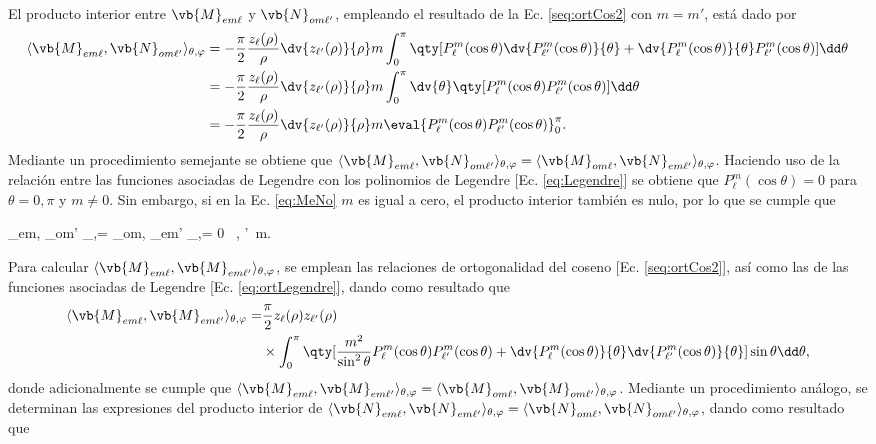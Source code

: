  El producto interior entre $\vb{M}_{em\ell}$ y $\vb{N}_{om\ell'}$, empleando el resultado de la Ec. \eqref{seq:ortCos2} con $m=m'$, está dado por
	\begin{align}
		\langle\vb{M}_{em\ell},  \vb{N}_{om\ell'} \rangle_{\theta,\varphi} &= - \frac{\pi}{2} \frac{z_\ell (\rho)}{\rho}\dv{z_{\ell'}(\rho)}{\rho}	m
							 \int_0^\pi\qty[P_\ell^m(\cos \theta )\dv{P_{\ell'}^m(\cos \theta )}{\theta}+ 
							  \dv{P_{\ell}^m(\cos \theta )}{\theta}P_{\ell'}^m(\cos \theta )] \dd\theta \notag\\
					 &=- \frac{\pi}{2} \frac{z_\ell (\rho)}{\rho}\dv{z_{\ell'}(\rho)}{\rho}	m 
					 	\int_0^\pi \dv{\theta}\qty[P_\ell^m(\cos\theta)P_{\ell'}^m(\cos\theta)]\dd\theta \notag\\
					 &=- \frac{\pi}{2} \frac{z_\ell (\rho)}{\rho}\dv{z_{\ell'}(\rho)}{\rho}	m \eval{P_\ell^m(\cos\theta)P_{\ell'}^m(\cos\theta)}_0^\pi.
					 	\label{eq:MeNo}
	\end{align}
Mediante un procedimiento semejante se obtiene que $\langle\vb{M}_{em\ell},  \vb{N}_{om\ell'} \rangle_{\theta,\varphi}=\langle\vb{M}_{om\ell},  \vb{N}_{em\ell'} \rangle_{\theta,\varphi}$. Haciendo uso de la relación entre las funciones asociadas de Legendre con los polinomios de Legendre [Ec. \eqref{eq:Legendre}] se obtiene que $P_\ell^m(\cos\theta)=0$ para $\theta=0,\pi$ y $m\neq 0$. Sin embargo, si en la Ec. \eqref{eq:MeNo} $m$ es igual a cero, el producto interior también es nulo, por lo que se cumple que 
%
	\begin{tcolorbox}
		\langle{}_{em\ell},  _{om\ell'} \rangle_{\theta,\varphi}=
		\langle{}_{om\ell},  _{em\ell'} \rangle_{\theta,\varphi}= 0	
		\qquad \forall\, \ell, \ell'\, m.
	\end{tcolorbox}
%	
Para calcular $\langle\vb{M}_{em\ell},\vb{M}_{em\ell'}\rangle_{\theta,\varphi}$, se emplean las relaciones de ortogonalidad del coseno [Ec. \eqref{seq:ortCos2}],  así como las de las funciones asociadas de Legendre [Ec. \eqref{eq:ortLegendre}], dando como resultado que
% 
	\begin{align*}
		\langle\vb{M}_{em\ell},  \vb{M}_{em\ell'} \rangle_{\theta,\varphi} =& 
				\frac{\pi}{2} z_\ell (\rho) z_{\ell'}(\rho)\\
				&\times	 \int_0^\pi\qty[\frac{m^2}{\sin^2\theta}P_\ell^m(\cos\theta)P_{\ell'}^m(\cos\theta)
				 +\dv{P_\ell^m(\cos\theta)}{\theta}\dv{P_{\ell'}^m(\cos\theta)}{\theta}]\sin\theta\dd\theta,		 
	\end{align*}
%	
donde adicionalmente se cumple que $\langle\vb{M}_{em\ell},  \vb{M}_{em\ell'} \rangle_{\theta,\varphi}=\langle\vb{M}_{om\ell},  \vb{M}_{om\ell'} \rangle_{\theta,\varphi}$. Mediante un procedimiento análogo, se determinan las expresiones del producto interior de $\langle\vb{N}_{em\ell},  \vb{N}_{em\ell'} \rangle_{\theta,\varphi}=\langle\vb{N}_{om\ell},  \vb{N}_{om\ell'} \rangle_{\theta,\varphi}$, dando como resultado que
